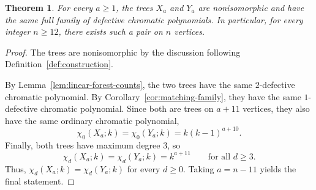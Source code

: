 \documentclass[12pt,reqno]{amsart}
\newtheorem{thm}{Theorem}[section]
\theoremstyle{definition}
\begin{document}
\begin{thm}\label{thm:infinite-family}
For every $a\geq 1$, the trees $X_a$ and $Y_a$ are nonisomorphic and have the same full family of defective chromatic polynomials. In particular, for every integer $n\geq 12$, there exists such a pair on $n$ vertices.
\end{thm}

\begin{proof}
The trees are nonisomorphic by the discussion following Definition~\ref{def:construction}.

By Lemma~\ref{lem:linear-forest-counts}, the two trees have the same $2$-defective chromatic polynomial. By Corollary~\ref{cor:matching-family}, they have the same $1$-defective chromatic polynomial. Since both are trees on $a+11$ vertices, they also have the same ordinary chromatic polynomial,
\[
\chi_0(X_a;k)=\chi_0(Y_a;k)=k(k-1)^{a+10}.
\]
Finally, both trees have maximum degree $3$, so
\[
\chi_d(X_a;k)=\chi_d(Y_a;k)=k^{a+11}\qquad\text{for all }d\geq 3.
\]
Thus, $\chi_d(X_a;k)=\chi_d(Y_a;k)$ for every $d\geq 0$. Taking $a=n-11$ yields the final statement.
\end{proof}
\end{document}

